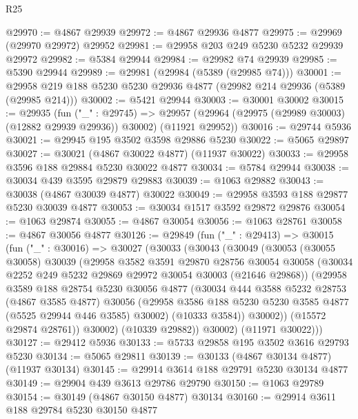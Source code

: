 \begin{lexlean}{R25}
\begin{coremodule}
@29970 := @4867 @29939
@29972 := @4867 @29936 @4877
@29975 := @29969 (@29970 @29972) @29952
@29981 := @29958 @203 @249 @5230 @5232 @29939 @29972
@29982 := @5384 @29944
@29984 := @29982 @74 @29939
@29985 := @5390 @29944
@29989 := @29981 (@29984 (@5389 (@29985 @74)))
@30001 := @29958 @219 @188 @5230 @5230 @29936 @4877 (@29982 @214 @29936 (@5389 (@29985 @214)))
@30002 := @5421 @29944
@30003 := @30001 @30002
@30015 := @29935
    (fun ("_" : @29745) =>
    @29957 (@29964 (@29975 (@29989 @30003) (@12882 @29939 @29936)) @30002) (@11921 @29952))
@30016 := @29744 @5936
@30021 := @29945 @195 @3502 @3598 @29886 @5230
@30022 := @5065 @29897
@30027 := @30021 (@4867 @30022 @4877) (@11937 @30022)
@30033 := @29958 @3596 @188 @29884 @5230 @30022 @4877
@30034 := @5784 @29944
@30038 := @30034 @439 @3595 @29879 @29883
@30039 := @1063 @29882
@30043 := @30038 (@4867 @30039 @4877) @30022
@30049 := @29958 @3593 @188 @29877 @5230 @30039 @4877
@30053 := @30034 @1517 @3592 @29872 @29876
@30054 := @1063 @29874
@30055 := @4867 @30054
@30056 := @1063 @28761
@30058 := @4867 @30056 @4877
@30126 := @29849
    (fun ("_" : @29413) =>
    @30015
      (fun ("_" : @30016) =>
      @30027
        (@30033
          (@30043
            (@30049
              (@30053
                (@30055 @30058)
                @30039
                (@29958
                  @3582
                  @3591
                  @29870
                  @28756
                  @30054
                  @30058
                  (@30034 @2252 @249 @5232 @29869 @29972 @30054 @30003 (@21646 @29868))
                  (@29958
                    @3589
                    @188
                    @28754
                    @5230
                    @30056
                    @4877
                    (@30034
                      @444
                      @3588
                      @5232
                      @28753
                      (@4867 @3585 @4877)
                      @30056
                      (@29958 @3586 @188 @5230 @5230 @3585 @4877 (@5525 @29944 @446 @3585) @30002)
                      (@10333 @3584))
                    @30002))
                (@15572 @29874 @28761))
              @30002)
            (@10339 @29882))
          @30002)
        (@11971 @30022)))
@30127 := @29412 @5936
@30133 := @5733 @29858 @195 @3502 @3616 @29793 @5230
@30134 := @5065 @29811
@30139 := @30133 (@4867 @30134 @4877) (@11937 @30134)
@30145 := @29914 @3614 @188 @29791 @5230 @30134 @4877
@30149 := @29904 @439 @3613 @29786 @29790
@30150 := @1063 @29789
@30154 := @30149 (@4867 @30150 @4877) @30134
@30160 := @29914 @3611 @188 @29784 @5230 @30150 @4877

\end{coremodule}
\end{lexlean}
